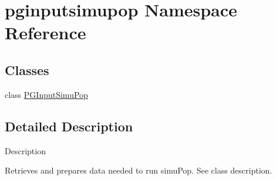 \hypertarget{namespacepginputsimupop}{}\section{pginputsimupop Namespace Reference}
\label{namespacepginputsimupop}
\subsection*{Classes}
\begin{DoxyCompactItemize}
\item 
class \hyperlink{classpginputsimupop_1_1PGInputSimuPop}{P\+G\+Input\+Simu\+Pop}
\end{DoxyCompactItemize}


\subsection{Detailed Description}
\begin{DoxyVerb}Description

Retrieves and prepares data needed to run simuPop.  See class description.\end{DoxyVerb}
 